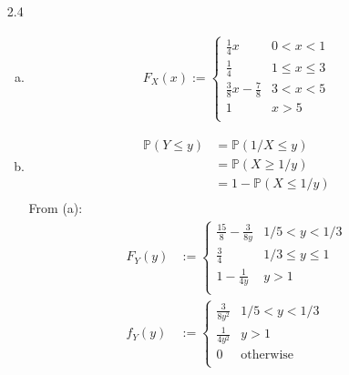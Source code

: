 \documentclass[a4paper,10pt]{article}
\theoremstyle{definition}
\begin{document}
\begin{enumerate}
\begin{enumerate}
\end{enumerate}
\item[2.4] 
\begin{enumerate}[(a)]
\item 
\begin{align*}
F_X(x):= \begin{cases}
\frac{1}{4}x & 0 < x < 1\\
\frac{1}{4} & 1 \leq x \leq 3\\
\frac{3}{8}x-\frac{7}{8} & 3 < x < 5\\
1 & x>5\\
\end{cases}
\end{align*}
\item
\begin{align*}
\mathbb{P}(Y \leq y) &= \mathbb{P}(1/X\leq y)\\
&=\mathbb{P}(X\geq 1/y)\\
&=1 - \mathbb{P}(X\leq 1/y)\\
\end{align*}
From (a):
\begin{align*}
F_Y(y)&:= \begin{cases}
\frac{15}{8}-\frac{3}{8y} & 1/5 < y < 1/3\\
\frac{3}{4} & 1/3\leq y \leq 1\\
1 - \frac{1}{4y} & y > 1\\
\end{cases}\\
f_Y(y)&:= \begin{cases}
\frac{3}{8y^2} & 1/5 < y < 1/3\\
\frac{1}{4y^2} & y >1\\
0 & \text{otherwise}\\
\end{cases}
\end{align*}


\end{enumerate}
\end{enumerate}
\end{document}
